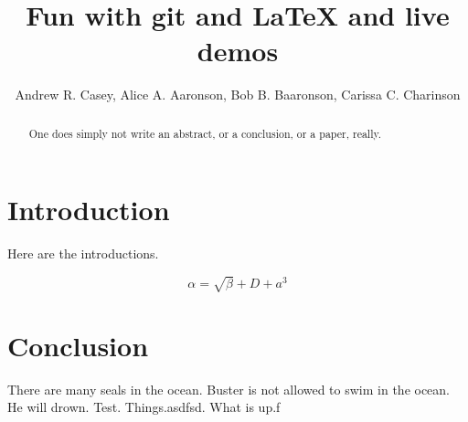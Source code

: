 \documentclass{article}
\begin{document}
\title{Fun with git and \LaTeX{} and live demos}
\author{Andrew R. Casey, Alice A. Aaronson, Bob B. Baaronson, Carissa C. Charinson}

\maketitle

\begin{abstract}
One does simply not write an abstract, or a conclusion, or a paper, really.
\end{abstract}

\section{Introduction}
Here are the introductions.

\begin{equation}
    \label{simple_equation}
    \alpha = \sqrt{ \beta } + D + a^3
\end{equation}


\section{Conclusion}
There are many seals in the ocean. Buster is not allowed to swim in the ocean. He will drown.
Test. Things.asdfsd. What is up.f
\end{document}
